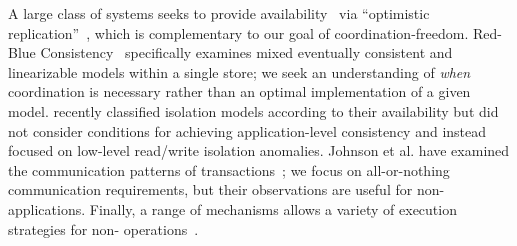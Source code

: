  A large class of systems
seeks to provide availability~\cite{gilbert-cap} via ``optimistic
replication''~\cite{optimistic}, which is complementary to our goal of
coordination-freedom. Red-Blue Consistency~\cite{redblue} specifically
examines mixed eventually consistent and linearizable models within a
single store; we seek an understanding of \textit{when} coordination
is necessary rather than an optimal implementation of a given
model. \cite{hat-vldb} recently classified isolation models according
to their availability but did not consider conditions for achieving
application-level consistency and instead focused on low-level
read/write isolation anomalies.  Johnson et al. have examined the
communication patterns of transactions~\cite{shore-communication}; we
focus on all-or-nothing communication requirements, but their
observations are useful for non-\iconfluent applications. Finally, a
range of mechanisms allows a variety of execution strategies for
non-\cfree
operations~\cite{silo,spanner,mdcc,bernstein-book,tamer-book,hstore,megastore}.

